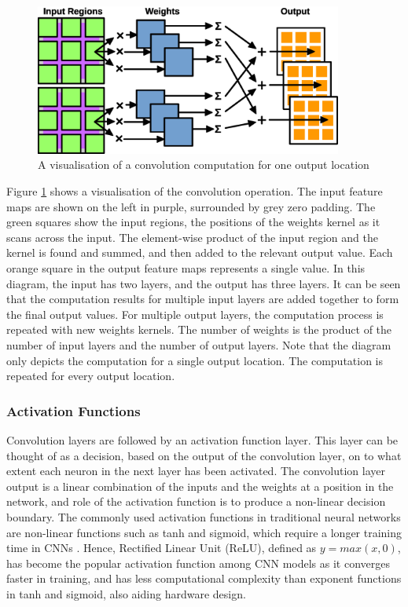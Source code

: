 \documentclass[12pt]{article}
\begin{document}
\begin{figure} [H]
\centering
\includegraphics[width=0.9\textwidth]{figures/conv.eps}
\caption{A visualisation of a convolution computation for one output location}
\label{fig:conv}
\end{figure}

Figure \ref{fig:conv} shows a visualisation of the convolution operation. The input feature maps are shown on the left in purple, surrounded by grey zero padding. The green squares show the input regions, the positions of the weights kernel as it scans across the input. The element-wise product of the input region and the kernel is found and summed, and then added to the relevant output value. Each orange square in the output feature maps represents a single value. In this diagram, the input has two layers, and the output has three layers. It can be seen that the computation results for multiple input layers are added together to form the final output values. For multiple output layers, the computation process is repeated with new weights kernels. The number of weights is the product of the number of input layers and the number of output layers. Note that the diagram only depicts the computation for a single output location. The computation is repeated for every output location. 


\subsubsection{Activation Functions}
\label{sec:Background-CNN-Activation}

Convolution layers are followed by an activation function layer. This layer can be thought of as a decision, based on the output of the convolution layer, on to what extent each neuron in the next layer has been activated. The convolution layer output is a linear combination of the inputs and the weights at a position in the network, and role of the activation function is to produce a non-linear decision boundary. The commonly used activation functions in traditional neural networks are non-linear functions such as tanh and sigmoid, which require a longer training time in CNNs \cite{AlexNet}. Hence, Rectified Linear Unit (ReLU), defined as $y = max(x,0)$, has become the popular activation function among CNN models as it converges faster in training, and has less computational complexity than exponent functions in tanh and sigmoid, also aiding hardware design.
\end{document}
